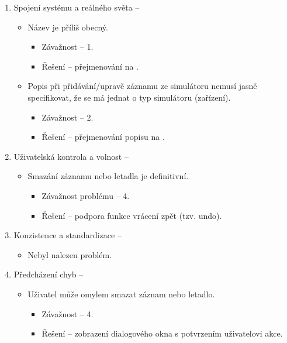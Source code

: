 \documentclass[thesis=M,czech]{FITthesis}[2012/06/26]
\begin{document}
\begin{enumerate}
\item Spojení systému a reálného světa -- 
\begin{itemize}
 	\item Název  je příliš obecný.
 	\begin{itemize}
 		\item Závažnost -- 1.
 		\item Řešení -- přejmenování  na .
 	\end{itemize}
 	\item Popis  při přidávání/upravě záznamu ze simulátoru nemusí jasně specifikovat, že se má jednat o typ simulátoru (zařízení).
 	\begin{itemize}
 		\item Závažnost -- 2.
 		\item Řešení -- přejmenování popisu  na .
 	\end{itemize}
\end{itemize}
 
\item Uživatelská kontrola a volnost -- 
\begin{itemize}
	\item Smazání záznamu nebo letadla je definitivní.
	\begin{itemize}
		\item Závažnost problému -- 4.
		\item Řešení -- podpora funkce vrácení zpět (tzv. undo).
	\end{itemize}
\end{itemize}
 
\item Konzistence a standardizace -- 
\begin{itemize}
 	\item Nebyl nalezen problém.
\end{itemize}
 
\item Předcházení chyb -- 
\begin{itemize}
 	\item Uživatel může omylem smazat záznam nebo letadlo.
 	\begin{itemize}
 		\item Závažnost -- 4.
 		\item Řešení -- zobrazení dialogového okna s potvrzením uživatelovi akce.
 	\end{itemize}
\end{itemize}
 

\end{enumerate}
\end{document}
